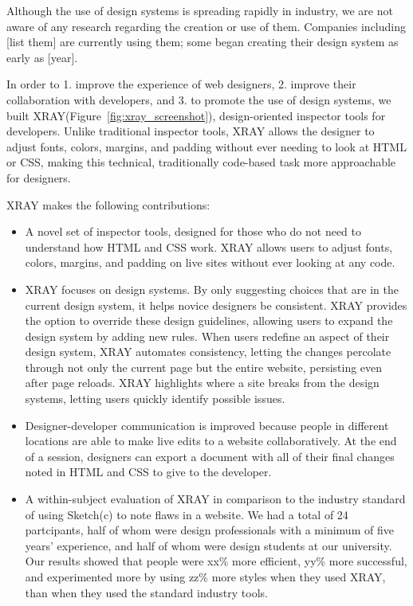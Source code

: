 \documentclass{sigchi}
\newcommand{\xray}{XRAY\xspace}
\begin{document}
Although the use of design systems is spreading rapidly in industry, we are not aware of any research regarding the creation or use of them. Companies including [list them] are currently using them; some began creating their design system as early as [year]. 

In order to 1. improve the experience of web designers, 2. improve their collaboration with developers, and 3. to promote the use of design systems, we built \xray (Figure~\ref{fig:xray_screenshot}), design-oriented inspector tools for developers. Unlike traditional inspector tools, \xray allows the designer to adjust fonts, colors, margins, and padding without ever needing to look at HTML or CSS, making this technical, traditionally code-based task more approachable for designers. 


\xray makes the following contributions: 

\begin{itemize}
    \item A novel set of inspector tools, designed for those who do not need to understand how HTML and CSS work. \xray allows users to adjust fonts, colors, margins, and padding on live sites without ever looking at any code. 
    
    \item \xray focuses on design systems. By only suggesting choices that are in the current design system, it helps novice designers be consistent. \xray provides the option to override these design guidelines, allowing users to expand the design system by adding new rules. When users redefine an aspect of their design system, \xray automates consistency, letting the changes percolate through not only the current page but the entire website, persisting even after page reloads. \xray highlights where a site breaks from the design systems, letting users quickly identify possible issues. 
    
    \item Designer-developer communication is improved because people in different locations are able to make live edits to a website collaboratively. At the end of a session, designers can export a document with all of their final changes noted in HTML and CSS to give to the developer.  
    
    \item A within-subject evaluation of \xray in comparison to the industry standard of using Sketch(c) to note flaws in a website. We had a total of 24 partcipants, half of whom were design professionals with a minimum of five years' experience, and half of whom were design students at our university. Our results showed that people were xx\% more efficient, yy\% more successful, and experimented more by using zz\% more styles when they used \xray, than when they used the standard industry tools.
\end{itemize}
\end{document}
